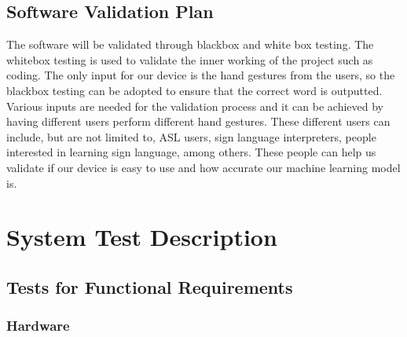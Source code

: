 \documentclass[12pt]{article}
\begin{document}
\subsection{Software Validation Plan}

The software will be validated through blackbox and white box  testing. The whitebox testing is used to validate the inner working of the project such as coding. The only input for our device is the hand gestures from the users, so the blackbox testing can be adopted to ensure that the correct word is outputted. Various inputs are needed for the validation process and it can be achieved by having different users perform different hand gestures. These different users can include, but are not limited to, ASL users, sign language interpreters, people interested in learning sign language, among others. These people can help us validate if our device is easy to use and how accurate our machine learning model is.

\section{System Test Description}
	
\subsection{Tests for Functional Requirements}


\subsubsection{Hardware}
		
  
\end{document}
